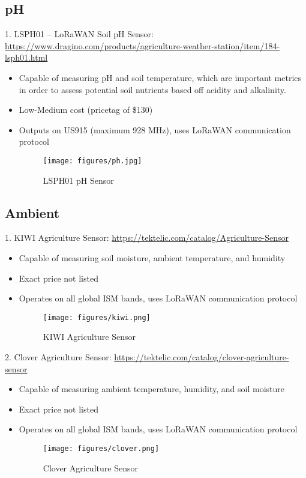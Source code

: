 \documentclass{article}
\begin{document}
\subsection{pH}
1. LSPH01 -- LoRaWAN Soil pH Sensor: \url{https://www.dragino.com/products/agriculture-weather-station/item/184-lsph01.html}
\begin{itemize}

\item Capable of measuring pH and soil temperature, which are important metrics in order to assess potential soil nutrients based off acidity and alkalinity.
\item Low-Medium cost (pricetag of \$130)	
\item Outputs on US915 (maximum 928 MHz), uses LoRaWAN communication protocol

\begin{figure}[htp]
    \centering
    \texttt{[image: figures/ph.jpg]}
    \caption{LSPH01 pH Sensor}
\end{figure}

\end{itemize}

\subsection{Ambient}
1. KIWI Agriculture Sensor: \url{https://tektelic.com/catalog/Agriculture-Sensor}
\begin{itemize}

\item Capable of measuring soil moisture, ambient temperature, and humidity
\item Exact price not listed
\item Operates on all global ISM bands, uses LoRaWAN communication protocol

\begin{figure}[htp]
    \centering
    \texttt{[image: figures/kiwi.png]}
    \caption{KIWI Agriculture Sensor}
\end{figure}

\end{itemize}

\item 2. Clover Agriculture Sensor: \url{https://tektelic.com/catalog/clover-agriculture-sensor}
\begin{itemize}

\item Capable of measuring ambient temperature, humidity, and soil moisture
\item Exact price not listed
\item Operates on all global ISM bands, uses LoRaWAN communication protocol

\begin{figure}[htp]
    \centering
    \texttt{[image: figures/clover.png]}
    \caption{Clover Agriculture Sensor}
\end{figure}

\end{itemize}
\end{document}
